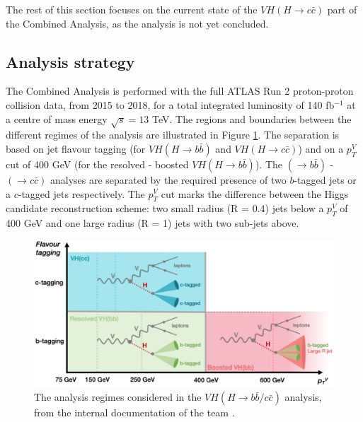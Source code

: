 The rest of this section focuses on the current state of the $VH (H\rightarrow c\bar{c})$ part of the Combined Analysis, as the analysis is not yet concluded. 

\subsection{Analysis strategy}
The Combined Analysis is performed with the full ATLAS Run 2 proton-proton collision data, from 2015 to 2018, for a total integrated luminosity of 140 fb$^{-1}$ at a centre of mass energy $\sqrt{s} = 13$ TeV. The regions and boundaries between the different regimes of the analysis are illustrated in Figure \ref{fig:ana-strat}. The separation is based on jet flavour tagging (for  $VH (H\rightarrow b\bar{b})$ and $VH (H\rightarrow c\bar{c})$) and on a $p_T^V$ cut of 400 GeV (for the resolved - boosted  $VH (H\rightarrow b\bar{b})$). The $(\rightarrow b\bar{b})$ - $(\rightarrow c\bar{c})$ analyses are separated by the required presence of two $b$-tagged jets or a $c$-tagged jets respectively. The $p_T^V$ cut marks the difference between the Higgs candidate reconstruction scheme: two small radius (R = 0.4) jets below a $p_T^V$ of 400 GeV and one large radius (R = 1) jets with two sub-jets above.

\begin{figure}[h!]
\center
\includegraphics[scale=0.35]{Images/VH/AnalysisRegime.png}
\caption{The analysis regimes considered in the $VH (H\rightarrow b\bar{b}/c\bar{c})$ analysis, from the internal documentation of the team \cite{Chisholm:2743096}.} 
\label{fig:ana-strat}
\end{figure}

